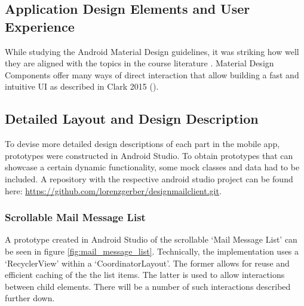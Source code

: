 \documentclass[a4paper,11pt,twoside]{article}
\begin{document}
\subsection{Application Design Elements and User Experience}
While studying the Android Material Design guidelines, it was striking how well
they are aligned with the topics in the course literature \cite{clark2015}.
Material Design Components offer many ways of direct interaction that allow
building a fast and intuitive UI as described in Clark 2015 (\cite[chapter 3,
'Enable primary tasks directly from list view']{clark2015}).


\subsection{Detailed Layout and Design Description}
To devise more detailed design descriptions of each part in the mobile app,
prototypes were constructed in Android Studio. To obtain prototypes that
can showcase a certain dynamic functionality, some mock classes and data had to be
included. A repository with the respective android studio project can be found
here: \url{https://github.com/lorenzgerber/designmailclient.git}.

\subsubsection{Scrollable Mail Message List}
A prototype created in Android Studio of the scrollable `Mail Message List' can be
seen in figure \ref{fig:mail_message_list}. Technically, the implementation
uses a `RecyclerView' within a `CoordinatorLayout'. The former allows for
reuse and efficient caching of the the list items. The latter is used to allow
interactions between child elements. There will be a number of such interactions
described further down.
\end{document}
